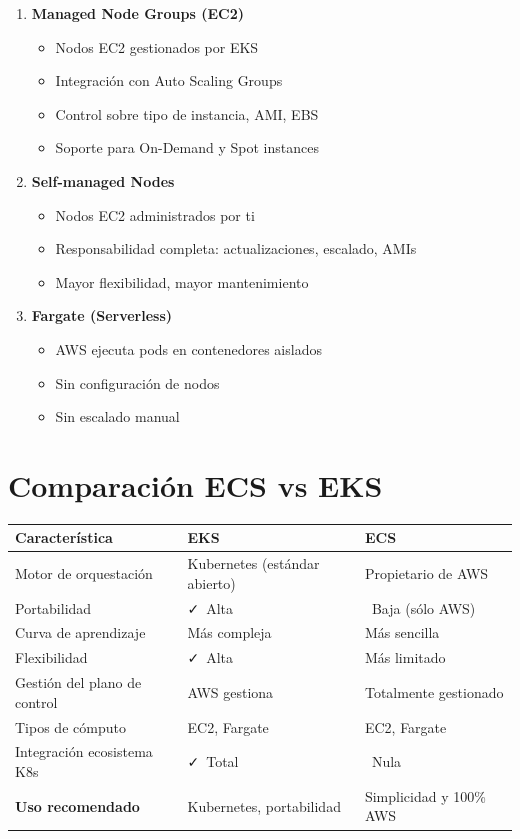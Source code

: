 \documentclass[12pt,a4paper]{report}
\newcommand{\vcheckmark}{\textcolor{successgreen}{\faCheck}}
\newcommand{\crossmark}{\textcolor{dangerred}{\faTimes}}
\begin{document}
\begin{enumerate}
    \item \textbf{Managed Node Groups (EC2)}
    \begin{itemize}
        \item Nodos EC2 gestionados por EKS
        \item Integración con Auto Scaling Groups
        \item Control sobre tipo de instancia, AMI, EBS
        \item Soporte para On-Demand y Spot instances
    \end{itemize}
    
    \item \textbf{Self-managed Nodes}
    \begin{itemize}
        \item Nodos EC2 administrados por ti
        \item Responsabilidad completa: actualizaciones, escalado, AMIs
        \item Mayor flexibilidad, mayor mantenimiento
    \end{itemize}
    
    \item \textbf{Fargate (Serverless)}
    \begin{itemize}
        \item AWS ejecuta pods en contenedores aislados
        \item Sin configuración de nodos
        \item Sin escalado manual
    \end{itemize}
\end{enumerate}

\section{Comparación ECS vs EKS}

\begin{center}
\begin{longtable}{|p{4cm}|p{5cm}|p{4cm}|}
\hline
\cellcolor{awsblue!20}\textbf{Característica} & \cellcolor{awsblue!20}\textbf{EKS} & \cellcolor{awsblue!20}\textbf{ECS} \\
\hline
Motor de orquestación & Kubernetes (estándar abierto) & Propietario de AWS \\
\hline
Portabilidad & \vcheckmark\ Alta & \crossmark\ Baja (sólo AWS) \\
\hline
Curva de aprendizaje & Más compleja & Más sencilla \\
\hline
Flexibilidad & \vcheckmark\ Alta & Más limitado \\
\hline
Gestión del plano de control & AWS gestiona & Totalmente gestionado \\
\hline
Tipos de cómputo & EC2, Fargate & EC2, Fargate \\
\hline
Integración ecosistema K8s & \vcheckmark\ Total & \crossmark\ Nula \\
\hline
\cellcolor{successgreen!20}\textbf{Uso recomendado} & Kubernetes, portabilidad & Simplicidad y 100\% AWS \\
\hline
\end{longtable}
\end{center}
\end{document}
